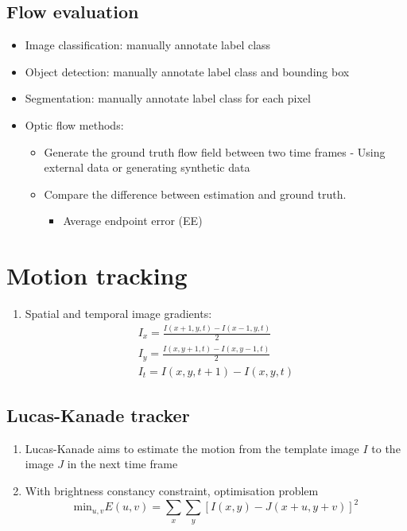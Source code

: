 \documentclass[9pt]{article}
\begin{document}
\begin{multicols*}{2}
    \subsection{Flow evaluation}
    \begin{itemize}
        \item Image classification: manually annotate label class
        \item Object detection: manually annotate label class and bounding box
        \item Segmentation: manually annotate label class for each pixel
        \item Optic flow methods:
        \begin{itemize}
            \item Generate the ground truth flow field between two time frames -
            Using external data or generating synthetic data
            \item Compare the difference between estimation and ground truth.
            \begin{itemize}
                \item Average endpoint error (EE)
            \end{itemize}
        \end{itemize}
    \end{itemize}

    \section{Motion tracking}
    \begin{enumerate}
        \item Spatial and temporal image gradients: 
        \begin{gather*}
            I_x = \frac{I(x+1,y,t) - I(x-1,y,t)}{2} \\ 
            I_y = \frac{I(x,y+1,t) - I(x,y-1,t)}{2} \\ 
            I_t = I(x,y,t+1) - I(x,y,t)
        \end{gather*}
    \end{enumerate}

    \subsection*{Lucas-Kanade tracker}
    \begin{enumerate}
        \item Lucas-Kanade aims to estimate the motion from the template image $I$ to 
        the image $J$ in the next time frame 
        \item With brightness constancy constraint, optimisation problem 
        $$
            \text{min}_{u,v} E(u,v) = \sum_x \sum_y [I(x,y) - J(x+u, y+v)]^2
        $$
    \end{enumerate}
    
\end{multicols*}
\end{document}
